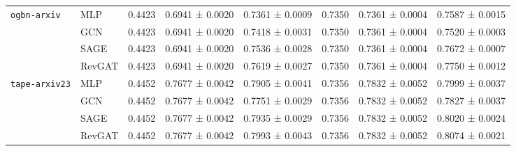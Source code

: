 \documentclass{article}
\begin{document}
\begin{table}[!ht]
\begin{tabular}{llcccccc}
         \midrule
    \multirow{3}{*}{\texttt{ogbn-arxiv}}
    & MLP
         & {0.4423}
         & {0.6941 ± 0.0020}
         & 0.7361 ± 0.0009
         & 0.7350
         & 0.7361 ± 0.0004
         & 0.7587 ± 0.0015
         \\
         & GCN 
         & {0.4423}
         & {0.6941 ± 0.0020}
         & {0.7418 ± 0.0031}
         & 0.7350
         & 0.7361 ± 0.0004
         & 0.7520 ± 0.0003
         \\
         & SAGE
         & {0.4423}
         & {0.6941 ± 0.0020}
         & {0.7536 ± 0.0028}
         & 0.7350
         & 0.7361 ± 0.0004
         & 0.7672 ± 0.0007
         \\
         & RevGAT
         & {0.4423}
         & {0.6941 ± 0.0020}
         & {0.7619 ± 0.0027}
         & 0.7350
         & 0.7361 ± 0.0004
         & {0.7750 ± 0.0012}
         \\
         \midrule
         \multirow{3}{*}{\texttt{tape-arxiv23}}
         & MLP
         & 0.4452
         & 0.7677 ± 0.0042
         & 0.7905 ± 0.0041
         & 0.7356
         & 0.7832 ± 0.0052
         & 0.7999 ± 0.0037
         \\
         & GCN
         & 0.4452
         & 0.7677 ± 0.0042
         & 0.7751 ± 0.0029
         & 0.7356
         & 0.7832 ± 0.0052
         & 0.7827 ± 0.0037
         \\
         & SAGE
         & 0.4452
         & 0.7677 ± 0.0042
         & 0.7935 ± 0.0029
         & 0.7356
         & 0.7832 ± 0.0052
         & 0.8020 ± 0.0024
         \\
         & RevGAT
         & 0.4452
         & 0.7677 ± 0.0042
         & 0.7993 ± 0.0043
         & 0.7356
         & 0.7832 ± 0.0052
         & 0.8074 ± 0.0021
         \\
    \bottomrule
    \end{tabular}
\end{table}
\end{document}
